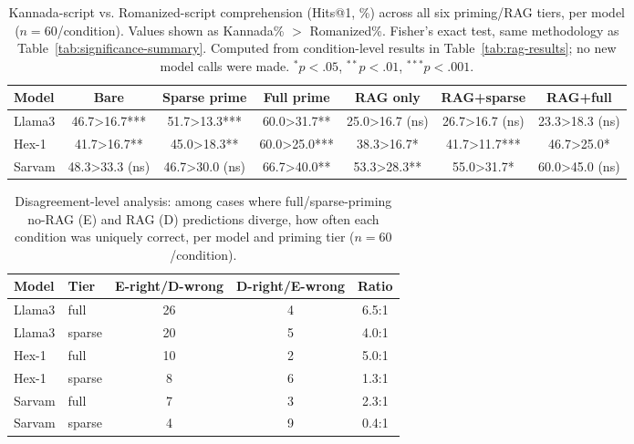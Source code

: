 \documentclass[11pt]{article}
\begin{document}
\begin{table}[t]
\centering
\small
\begin{tabular}{lcccccc}
\toprule
\textbf{Model} & \textbf{Bare} & \textbf{Sparse prime} & \textbf{Full prime} & \textbf{RAG only} & \textbf{RAG+sparse} & \textbf{RAG+full} \\
\midrule
Llama3 & 46.7>16.7*** & 51.7>13.3*** & 60.0>31.7** & 25.0>16.7 (ns) & 26.7>16.7 (ns) & 23.3>18.3 (ns) \\
Hex-1  & 41.7>16.7**  & 45.0>18.3**  & 60.0>25.0*** & 38.3>16.7*     & 41.7>11.7***   & 46.7>25.0* \\
Sarvam & 48.3>33.3 (ns) & 46.7>30.0 (ns) & 66.7>40.0** & 53.3>28.3**  & 55.0>31.7*     & 60.0>45.0 (ns) \\
\bottomrule
\end{tabular}
\caption{Kannada-script vs. Romanized-script comprehension (Hits@1, \%) across all six priming/RAG tiers, per model ($n=60$/condition). Values shown as Kannada\% $>$ Romanized\%. Fisher's exact test, same methodology as Table~\ref{tab:significance-summary}. Computed from condition-level results in Table~\ref{tab:rag-results}; no new model calls were made. $^*p<.05$, $^{**}p<.01$, $^{***}p<.001$.}
\label{tab:kannada-romanized}
\end{table}

\clearpage
\onecolumn
\begin{table}[tbp]
\centering
\small
\begin{tabular}{llccc}
\toprule
\textbf{Model} & \textbf{Tier} & \textbf{E-right/D-wrong} & \textbf{D-right/E-wrong} & \textbf{Ratio} \\
\midrule
Llama3 & full   & 26 & 4 & 6.5:1 \\
Llama3 & sparse & 20 & 5 & 4.0:1 \\
Hex-1  & full   & 10 & 2 & 5.0:1 \\
Hex-1  & sparse & 8  & 6 & 1.3:1 \\
Sarvam & full   & 7  & 3 & 2.3:1 \\
Sarvam & sparse & 4  & 9 & 0.4:1 \\
\bottomrule
\end{tabular}
\caption{Disagreement-level analysis: among cases where full/sparse-priming no-RAG (E) and RAG (D) predictions diverge, how often each condition was uniquely correct, per model and priming tier ($n=60$/condition).}
\label{tab:disagreement-ratio}
\end{table}
\end{document}
